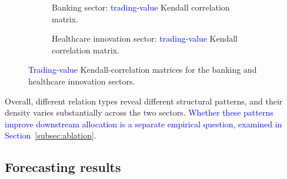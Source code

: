 \documentclass[pdflatex,sn-mathphys-num]{sn-jnl}%
\theoremstyle{thmstyleone}%
\theoremstyle{thmstyletwo}%
\theoremstyle{thmstylethree}%
\begin{document}
\begin{figure}[t]
    \centering


    \begin{subfigure}[t]{0.48\textwidth}
        \centering
        
        \caption{Banking sector: \textcolor{blue}{trading-value} Kendall correlation matrix.}
    \end{subfigure}\hfill
    \begin{subfigure}[t]{0.48\textwidth}
        \centering
        
        \caption{Healthcare innovation sector: \textcolor{blue}{trading-value} Kendall correlation matrix.}
    \end{subfigure}

    \caption{\textcolor{blue}{Trading-value} Kendall-correlation matrices for the banking and healthcare innovation sectors.}
    \label{fig:fig4}
\end{figure}

Overall, different relation types reveal different structural patterns, and their density varies substantially across the two sectors. \textcolor{blue}{Whether these patterns improve downstream allocation is a separate empirical question, examined in Section~\ref{subsec:ablation}.}

\subsection{Forecasting results}\label{sec:price_pred}
\end{document}
